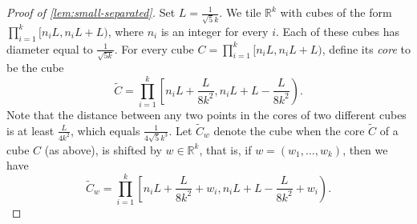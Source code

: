 \documentclass[12pt,a4paper,bold]{thesis}
\theoremstyle{definition}
\begin{document}
\begin{proof}[Proof of \cref{lem:small-separated}]
    Set $L = \frac{1}{\sqrt{5}k}$. We tile $\mathbb{R}^k$ with cubes of the form
    $\prod_{i=1}^{k} [n_iL, n_iL+L)$, where $n_i$ is an integer for every $i$.
    Each of these cubes has diameter equal to $\frac{1}{\sqrt{5k}}$. For every cube 
    $C = \prod_{i=1}^{k} [n_iL, n_iL+L)$, define its \emph{core} to be the cube
    \begin{equation*}
        \tilde C = \prod_{i=1}^{k} \left[n_iL + \frac{L}{8k^2}, n_iL + L - \frac{L}{8k^2}\right).
    \end{equation*}
    Note that the distance between any two points in the cores of two different
    cubes is at least $\frac{L}{4k^2}$, which equals $\frac{1}{4\sqrt{5}k^3}$.
	Let $\tilde C_w$ denote the cube when the core $\tilde C$ of a cube $C$ (as above), 
    is shifted by $w \in \mathbb{R}^k$, that is, if $w = (w_1, \dots, w_k)$, 
    then we have
	\begin{equation*}
		\tilde C_w = \prod_{i=1}^{k} \left[n_iL + \frac{L}{8k^2} + w_i, 
    	n_iL + L - \frac{L}{8k^2} + w_i\right).
	\end{equation*}


\end{proof}
\end{document}
